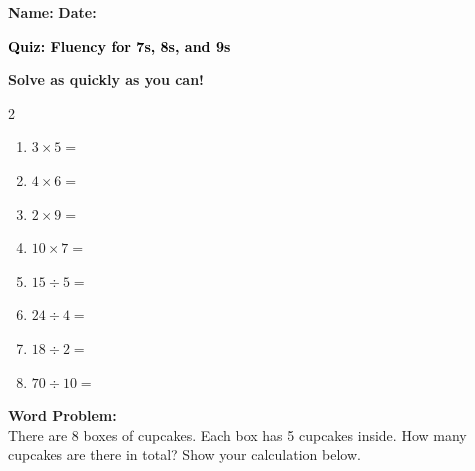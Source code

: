\documentclass[12pt, letterpaper, fleqn]{article}
\newcommand{\blank}{\underline{\hspace{2.2cm}}}
\begin{document}
\textbf{Name:} \underline{\hspace{5cm}}
\hfill
\textbf{Date:} \underline{\hspace{3cm}}\\

\begin{tcolorbox}[colback=customteal!20]
    \large\textcolor{black}{\textbf{Quiz: Fluency for 7s, 8s, and 9s}}
\end{tcolorbox}

\vspace{5mm}
\noindent
\textbf{Solve as quickly as you can!}

\vspace{5mm}
\begin{multicols}{2}
\begin{enumerate}[itemsep=1.2cm]
\item $3 \times 5 =$ \blank
\item $4 \times 6 =$ \blank
\item $2 \times 9 =$ \blank
\item $10 \times 7 =$ \blank
\item $15 \div 5 =$ \blank
\item $24 \div 4 =$ \blank
\item $18 \div 2 =$ \blank
\item $70 \div 10 =$ \blank
\end{enumerate}
\end{multicols}

\vspace{1.5cm}
\noindent
\textbf{Word Problem:}
\\
\noindent
There are 8 boxes of cupcakes. Each box has 5 cupcakes inside. How many cupcakes are there in total? Show your calculation below.
\vspace{3cm}
\end{document}
